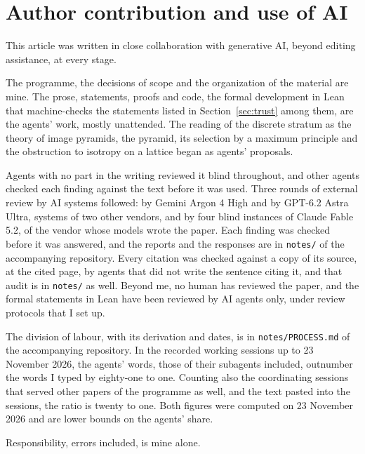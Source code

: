 \section*{Author contribution and use of AI}

This article was written in close collaboration with generative AI, beyond editing assistance, at
every stage.

The programme, the decisions of scope and the organization of the material are mine.
The prose, statements, proofs and code, the formal development in Lean that machine-checks the
statements listed in Section~\ref{sec:trust} among them, are the agents' work, mostly unattended.
The reading of the discrete stratum as the theory of image pyramids, the \Matern{} pyramid, its
selection by a maximum principle and the obstruction to isotropy on a lattice began as agents'
proposals.

Agents with no part in the writing reviewed it blind throughout, and other agents checked each
finding against the text before it was used. Three rounds of external review by AI systems
followed: by Gemini Argon 4 High and by GPT-6.2 Astra Ultra, systems of two other vendors, and by
four blind instances of Claude Fable 5.2, of the vendor whose models wrote the paper. Each finding
was checked before it was answered, and the reports and the responses are in \texttt{notes/} of the
accompanying repository. Every citation was checked against a copy of its source, at the cited
page, by agents that did not write the sentence citing it, and that audit is in \texttt{notes/}
as well. Beyond me, no human has
reviewed the paper, and the formal statements in
Lean have been reviewed by AI agents only, under review protocols that I set up.

The division of labour, with its derivation and dates, is in \texttt{notes/PROCESS.md} of the
accompanying repository. In the recorded working sessions up to 23 November 2026, the agents' words,
those of their subagents included, outnumber the words I typed by eighty-one to one. Counting
also the coordinating sessions that served other papers of the programme as well, and the text
pasted into the sessions, the ratio is twenty to one. Both figures were computed on 23 November
2026 and are lower bounds on the agents' share.

Responsibility, errors included, is mine alone.
